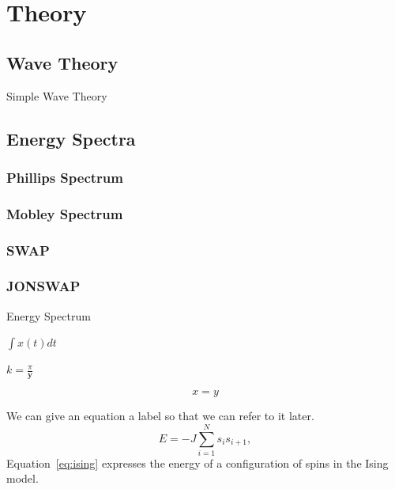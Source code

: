 \chapter{Theory}


\section{Wave Theory}

Simple Wave Theory

\section{Energy Spectra}

\subsection{Phillips Spectrum}
\subsection{Mobley Spectrum}
\subsection{SWAP}
\subsection{JONSWAP}


Energy Spectrum

$\int x(t) dt$

$k=\frac{\pi}{\mathbf y}$

\begin{equation}\label{eq:test} x = y \end{equation}

We can give an equation a label so that we can refer to it later.
\begin{equation}
\label{eq:ising}
E = -J \sum_{i=1}^N s_i s_{i+1} ,
\end{equation}
Equation~\eqref{eq:ising} expresses the energy of a configuration
of spins in the Ising model.

